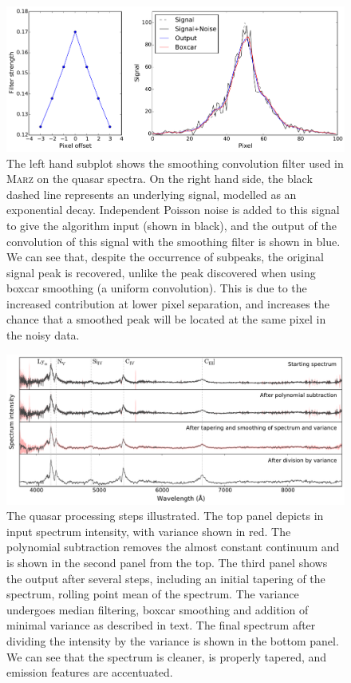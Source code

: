 \documentclass[5p]{elsarticle}
\newcommand{\marz}{\textsc{Marz}}
\begin{document}
\begin{figure}[t]
\centering
\includegraphics[width=\textwidth]{rolling.pdf}
\caption{The left hand subplot shows the smoothing convolution filter used in \marz{} on the quasar spectra. On the right hand side, the black dashed line represents an underlying signal, modelled as an exponential decay. Independent Poisson noise is added to this signal to give the algorithm input (shown in black), and the output of the convolution of this signal with the smoothing filter is shown in blue. We can see that, despite the occurrence of subpeaks, the original signal peak is recovered, unlike the peak discovered when using boxcar smoothing (a uniform convolution). This is due to the increased contribution at lower pixel separation, and increases the chance that a smoothed peak will be located at the same pixel in the noisy data.}
\label{fig:rolling}
\end{figure}

\begin{figure}
\centering
\includegraphics[width=\textwidth]{quasarProcess.pdf}
\caption{The quasar processing steps illustrated. The top panel depicts in input spectrum intensity, with variance shown in red. The polynomial subtraction removes the almost constant continuum and is shown in the second panel from the top. The third panel shows the output after several steps, including an initial tapering of the spectrum, rolling point mean of the spectrum. The variance undergoes median filtering, boxcar smoothing and addition of minimal variance as described in text. The final spectrum after dividing the intensity by the variance is shown in the bottom panel. We can see that the spectrum is cleaner, is properly tapered, and emission features are accentuated.}
\label{fig:quasarProcess}
\end{figure}
\end{document}
